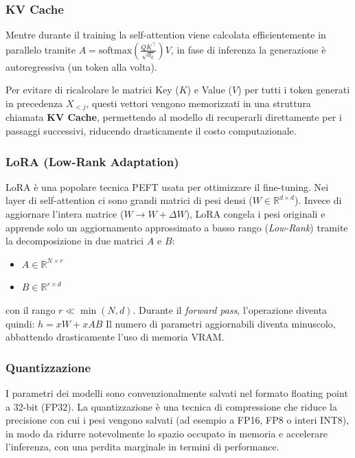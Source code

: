         \subsubsection{KV Cache}
            Mentre durante il training la self-attention viene calcolata efficientemente in parallelo tramite $A = \text{softmax}(\frac{QK^\top}{\sqrt{d_k}})V$, in fase di inferenza la generazione è autoregressiva (un token alla volta).

            Per evitare di ricalcolare le matrici Key ($K$) e Value ($V$) per tutti i token generati in precedenza $X_{<j}$, questi vettori vengono memorizzati in una struttura chiamata \textbf{KV Cache}, permettendo al modello di recuperarli direttamente per i passaggi successivi, riducendo drasticamente il costo computazionale.

        \subsubsection{LoRA (Low-Rank Adaptation)}
            LoRA è una popolare tecnica PEFT usata per ottimizzare il fine-tuning. Nei layer di self-attention ci sono grandi matrici di pesi densi ($W \in \mathbb{R}^{d \times d}$). Invece di aggiornare l'intera matrice ($W \rightarrow W + \Delta W$), LoRA congela i pesi originali e apprende solo un aggiornamento approssimato a basso rango (\textit{Low-Rank}) tramite la decomposizione in due matrici $A$ e $B$:
            \begin{itemize}
                \item $A \in \mathbb{R}^{N \times r}$
                \item $B \in \mathbb{R}^{r \times d}$
            \end{itemize}
            con il rango $r \ll \min(N,d)$. 
            Durante il \textit{forward pass}, l'operazione diventa quindi:
            $h = xW + xAB$
            Il numero di parametri aggiornabili diventa minuscolo, abbattendo drasticamente l'uso di memoria VRAM.

        \subsubsection{Quantizzazione}
            I parametri dei modelli sono convenzionalmente salvati nel formato floating point a 32-bit (FP32). La quantizzazione è una tecnica di compressione che riduce la precisione con cui i pesi vengono salvati (ad esempio a FP16, FP8 o interi INT8), in modo da ridurre notevolmente lo spazio occupato in memoria e accelerare l'inferenza, con una perdita marginale in termini di performance.